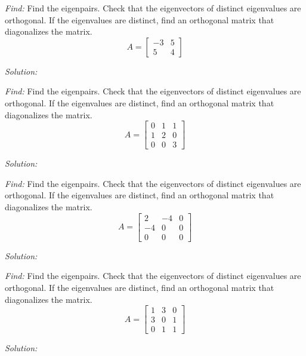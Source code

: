 \documentclass[11pt]{homework}
\begin{document}
\maketitle

\question
\emph{Find:}
\newline
Find the eigenpairs.
Check that the eigenvectors of distinct eigenvalues are orthogonal.
If the eigenvalues are distinct, find an orthogonal matrix that diagonalizes the matrix.
\begin{equation*}
A = 
  \begin{bmatrix}
  -3 & 5 \\
  5 & 4
  \end{bmatrix}
\end{equation*}

\emph{Solution:}
\newline


\question
\emph{Find:}
\newline
Find the eigenpairs.
Check that the eigenvectors of distinct eigenvalues are orthogonal.
If the eigenvalues are distinct, find an orthogonal matrix that diagonalizes the matrix.
\begin{equation*}
A = 
  \begin{bmatrix}
  0 & 1 & 1 \\
  1 & 2 & 0 \\
  0 & 0 & 3
  \end{bmatrix}
\end{equation*}

\emph{Solution:}
\newline


\question
\emph{Find:}
\newline
Find the eigenpairs.
Check that the eigenvectors of distinct eigenvalues are orthogonal.
If the eigenvalues are distinct, find an orthogonal matrix that diagonalizes the matrix.
\begin{equation*}
A = 
  \begin{bmatrix}
  2 & -4 & 0 \\
  -4 & 0 & 0 \\
  0 &  0 & 0
  \end{bmatrix}
\end{equation*}

\emph{Solution:}
\newline

\question
\emph{Find:}
\newline
Find the eigenpairs.
Check that the eigenvectors of distinct eigenvalues are orthogonal.
If the eigenvalues are distinct, find an orthogonal matrix that diagonalizes the matrix.
\begin{equation*}
A = 
  \begin{bmatrix}
  1 & 3 & 0 \\
  3 & 0 & 1 \\
  0 & 1 & 1
  \end{bmatrix}
\end{equation*}

\emph{Solution:}
\newline
\end{document}
